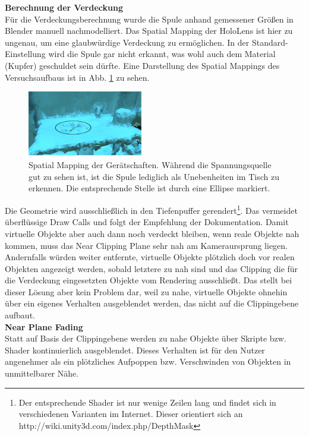 \textbf{Berechnung der Verdeckung}\\
Für die Verdeckungsberechnung wurde die Spule anhand gemessener Größen in Blender manuell nachmodelliert. Das Spatial Mapping der HoloLens ist hier zu ungenau, um eine glaubwürdige Verdeckung zu ermöglichen. In der Standard-Einstellung wird die Spule gar nicht erkannt, was wohl auch dem Material (Kupfer) geschuldet sein dürfte. Eine Darstellung des Spatial Mappings des Versuchsaufbaus ist in Abb. \ref{img:mesh-vs-model} zu sehen.
\begin{figure}[h!]
	\centering
	\includegraphics[width=0.45\textwidth]{images/HL/mesh.jpg}
	\caption{Spatial Mapping der Gerätschaften. Während die Spannungsquelle gut zu sehen ist, ist die Spule lediglich als Unebenheiten im Tisch zu erkennen. Die entsprechende Stelle ist durch eine Ellipse markiert.}
	\label{img:mesh-vs-model}
\end{figure}
Die Geometrie wird ausschließlich in den Tiefenpuffer gerendert\footnote{Der entsprechende Shader ist nur wenige Zeilen lang und findet sich in verschiedenen Varianten im Internet. Dieser orientiert sich an http://wiki.unity3d.com/index.php/DepthMask}. Das vermeidet überflüssige Draw Calls und folgt der Empfehlung der Dokumentation. Damit virtuelle Objekte aber auch dann noch verdeckt bleiben, wenn reale Objekte nah kommen, muss das Near Clipping Plane sehr nah am Kameraursprung liegen. Andernfalls würden weiter entfernte, virtuelle Objekte plötzlich doch vor realen Objekten angezeigt werden, sobald letztere zu nah sind und das Clipping die für die Verdeckung eingesetzten Objekte vom Rendering ausschließt. Das stellt bei dieser Lösung aber kein Problem dar, weil zu nahe, virtuelle Objekte ohnehin über ein eigenes Verhalten ausgeblendet werden, das nicht auf die Clippingebene aufbaut.\\


\textbf{Near Plane Fading}\\
Statt auf Basis der Clippingebene werden zu nahe Objekte über Skripte bzw. Shader kontinuierlich ausgeblendet. Dieses Verhalten ist für den Nutzer angenehmer als ein plötzliches Aufpoppen bzw. Verschwinden von Objekten in unmittelbarer Nähe.\\

